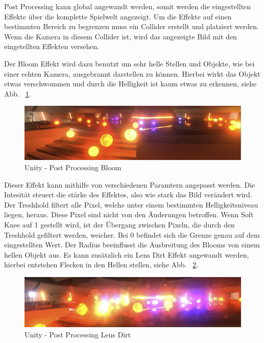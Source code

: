 Post Processing kann global angewandt werden, somit werden die eingestellten Effekte \"uber die komplette Spielwelt angezeigt.
Um die Effekte auf einen bestimmten Bereich zu begrenzen muss ein Collider erstellt und platziert werden.
Wenn die Kamera in diesem Collider ist, wird das angezeigte Bild mit den eingetellten Effekten versehen.
~\cite{Unity_Post_Processing_Volumes_2022}

Der Bloom Effekt wird dazu benutzt um sehr helle Stellen und Objekte, wie bei einer echten Kamera, ausgebrannt darstellen zu können.
Hierbei wirkt das Objekt etwas verschwommen und durch die Helligkeit ist kaum etwas zu erkennen, siehe Abb. ~\ref{fig:unity-post-processing-bloom}.
\begin {figure}
    \centering
    \includegraphics[scale=0.9]{pics/unity-post-processing-bloom}
    \caption{Unity - Post Processing Bloom}
    \label{fig:unity-post-processing-bloom}
\end {figure}
Dieser Effekt kann mithilfe von verschiedenen Paramtern angepasst werden.
Die Intesität steuert die stärke des Effektes, also wie stark das Bild verändert wird.
Der Treshhold filtert alle Pixel, welche unter einem bestimmten Helligkeitsniveau liegen, heraus.
Diese Pixel sind nicht von den Änderungen betroffen.
Wenn Soft Knee auf 1 gestellt wird, ist der Übergang zwischen Pixeln, die durch den Treshhold gefiltert werden, weicher.
Bei 0 befindet sich die Grenze genau auf dem eingestellten Wert.
Der Radius beeinflusst die Ausbreitung des Blooms von einem hellen Objekt aus.
Es kann zusätzlich ein Lens Dirt Effekt angewandt werden, hierbei entstehen Flecken in den Hellen stellen, siehe Abb. ~\ref{fig:unity-post-processing-lens-dirt}.
~\cite{Unity_Post_Processing_Bloom_2022}

\begin {figure}
    \centering
    \includegraphics[scale=0.9]{pics/unity-post-processing-lens-dirt}
    \caption{Unity - Post Processing Lens Dirt}
    \label{fig:unity-post-processing-lens-dirt}
\end {figure}

